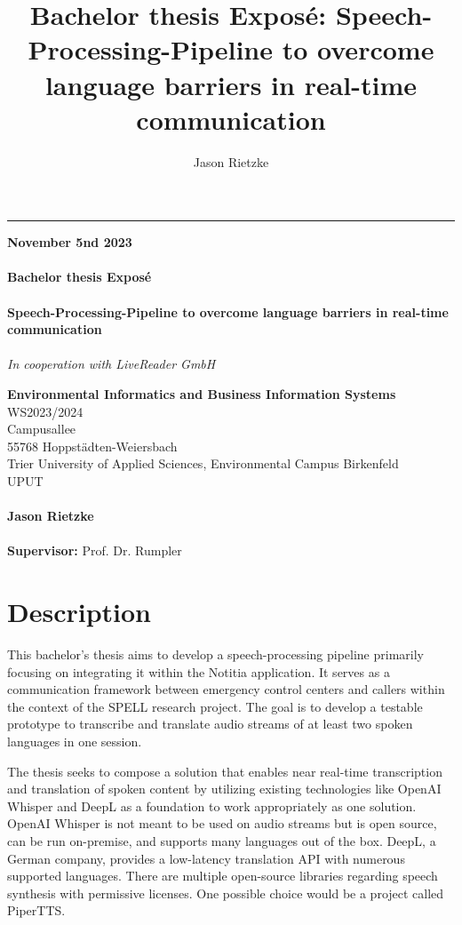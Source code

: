 \documentclass[a4paper,10pt]{article}
\title{Bachelor thesis Exposé: Speech-Processing-Pipeline to overcome language barriers in real-time communication}
\author{Jason Rietzke}
\begin{document}
\begin{titlepage}
\raggedleft
\rule{1pt}{\textheight}
\hspace{0.05\textwidth}
\parbox[b]{0.85\textwidth}{
  {\textbf{November 5nd 2023}}\\\\
  {\Huge\bfseries Bachelor thesis Exposé \\[0.5\baselineskip]}\\[2\baselineskip]
  {\Large\bfseries Speech-Processing-Pipeline to overcome language barriers in real-time communication \\[0.5\baselineskip]}\\[2\baselineskip]
  {\large\textit{In cooperation with LiveReader GmbH}}\\[4\baselineskip]

  \vspace{0.28\textheight}

  {\textbf{Environmental Informatics and Business Information Systems}\\}
  {WS2023/2024}\\
  {Campusallee}\\
  {55768 Hoppstädten-Weiersbach}\\
  {Trier University of Applied Sciences, Environmental Campus Birkenfeld}\\
  {UPUT}\\
  \\
  {\textbf{Jason Rietzke}\\}
  \\
  {\textbf{Supervisor:} Prof. Dr. Rumpler}\\
}

\end{titlepage}

\restoregeometry
\nopagecolor


\section{Description}
This bachelor's thesis aims to develop a speech-processing pipeline primarily focusing on integrating it within the Notitia application.
It serves as a communication framework between emergency control centers and callers within the context of the SPELL research project.
The goal is to develop a testable prototype to transcribe and translate audio streams of at least two spoken languages in one session.

The thesis seeks to compose a solution that enables near real-time transcription and translation of spoken content by utilizing existing technologies like OpenAI Whisper and DeepL as a foundation to work appropriately as one solution.
OpenAI Whisper is not meant to be used on audio streams but is open source, can be run on-premise, and supports many languages out of the box. DeepL, a German company, provides a low-latency translation API with numerous supported languages.
There are multiple open-source libraries regarding speech synthesis with permissive licenses. One possible choice would be a project called PiperTTS.
\end{document}
